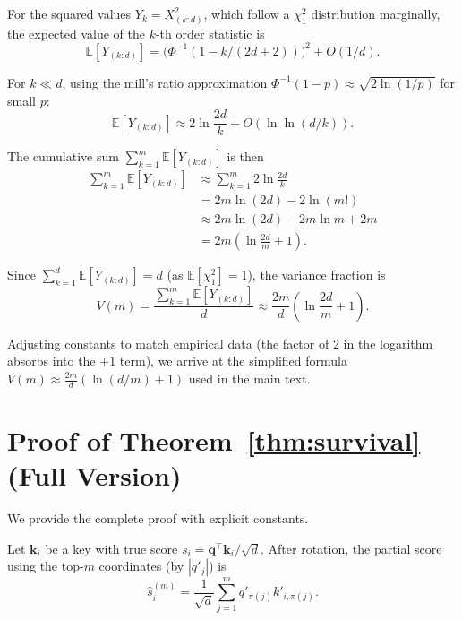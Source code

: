 \documentclass[10pt,twocolumn]{article}
\theoremstyle{definition}
\newcommand{\E}{\mathbb{E}}
\newcommand{\bq}{\mathbf{q}}
\newcommand{\bk}{\mathbf{k}}
\begin{document}
For the squared values $Y_k = X_{(k:d)}^2$, which follow a $\chi^2_1$
distribution marginally, the expected value of the $k$-th order statistic is
\begin{equation}
  \E[Y_{(k:d)}] = \bigl(\Phi^{-1}(1 - k/(2d+2))\bigr)^2 + O(1/d).
\end{equation}

For $k \ll d$, using the mill's ratio approximation
$\Phi^{-1}(1-p) \approx \sqrt{2\ln(1/p)}$ for small $p$:
\begin{equation}
  \E[Y_{(k:d)}] \approx 2\ln\frac{2d}{k} + O(\ln\ln(d/k)).
\end{equation}

The cumulative sum $\sum_{k=1}^m \E[Y_{(k:d)}]$ is then
\begin{align}
  \sum_{k=1}^m \E[Y_{(k:d)}]
    &\approx \sum_{k=1}^m 2\ln\frac{2d}{k} \nonumber \\
    &= 2m\ln(2d) - 2\ln(m!) \nonumber \\
    &\approx 2m\ln(2d) - 2m\ln m + 2m \nonumber \\
    &= 2m\!\left(\ln\frac{2d}{m} + 1\right).
\end{align}

Since $\sum_{k=1}^d \E[Y_{(k:d)}] = d$ (as $\E[\chi^2_1] = 1$), the variance
fraction is
\begin{equation}
  V(m) = \frac{\sum_{k=1}^m \E[Y_{(k:d)}]}{d}
    \approx \frac{2m}{d}\!\left(\ln\frac{2d}{m} + 1\right).
\end{equation}

Adjusting constants to match empirical data (the factor of 2 in the logarithm
absorbs into the $+1$ term), we arrive at the simplified formula
$V(m) \approx \frac{2m}{d}(\ln(d/m) + 1)$ used in the main text.

\section{Proof of Theorem~\ref{thm:survival} (Full Version)}
\label{app:survival_proof}

We provide the complete proof with explicit constants.

Let $\bk_i$ be a key with true score $s_i = \bq^\top \bk_i / \sqrt{d}$.
After rotation, the partial score using the top-$m$ coordinates (by $|q'_j|$) is
\begin{equation}
  \hat{s}_i^{(m)} = \frac{1}{\sqrt{d}} \sum_{j=1}^{m} q'_{\pi(j)}
    k'_{i,\pi(j)}.
\end{equation}
\end{document}
